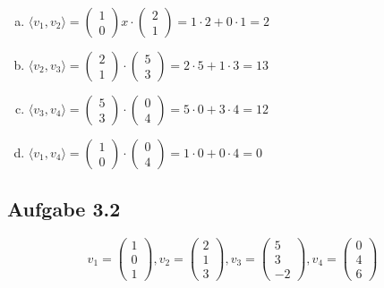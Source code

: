 \documentclass{standalone}
\begin{document}
\begin{enumerate}[a)]
    \item $ \langle v_1,v_2 \rangle = \begin{pmatrix}
        1 \\ 0 
    \end{pmatrix}x
    \cdot \begin{pmatrix}
        2 \\ 1
    \end{pmatrix}
    = 1 \cdot 2 + 0 \cdot 1 = 2$
    \item $ \langle v_2,v_3 \rangle = \begin{pmatrix}
        2 \\ 1
    \end{pmatrix}
    \cdot \begin{pmatrix}
        5 \\ 3
    \end{pmatrix}
    = 2 \cdot 5 + 1 \cdot 3 = 13$
    \item $ \langle v_3,v_4 \rangle = \begin{pmatrix}
        5 \\ 3
    \end{pmatrix}
    \cdot \begin{pmatrix}
        0 \\ 4
    \end{pmatrix}
    = 5 \cdot 0 + 3 \cdot 4 = 12$
    \item $ \langle v_1,v_4 \rangle = \begin{pmatrix}
        1 \\ 0
    \end{pmatrix}
    \cdot \begin{pmatrix}
        0 \\ 4
    \end{pmatrix}
    = 1 \cdot 0 + 0 \cdot 4 = 0 $
    
   
    

\end{enumerate}

\subsection{Aufgabe 3.2}

$$
    v_1 = \begin{pmatrix} 1 \\ 0 \\ 1 \end{pmatrix},
    v_2 = \begin{pmatrix} 2 \\ 1 \\ 3 \end{pmatrix},
    v_3 = \begin{pmatrix} 5 \\ 3 \\ -2 \end{pmatrix},
    v_4 = \begin{pmatrix} 0 \\ 4 \\ 6 \end{pmatrix}
$$
\end{document}
